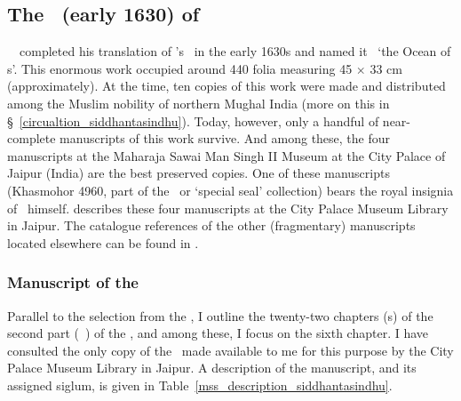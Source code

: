 \subsection{The \Siddhantasindhu\ (\circa early 1630) of \Nityananda}\label{siddhantasindhu_nityananda} 

\Pandita\ \Nityanandafull\ completed his translation of \MullaFarid's \ZijiShahJahani\ in the early 1630s and named it \Siddhantasindhu\ `the Ocean of \mbox{\Siddhanta s}'. This enormous work occupied around 440 folia measuring 45 $\times$ 33 cm (approximately). At the time, ten copies of this work were made and distributed among the Muslim nobility of northern Mughal India (more on this in \S~\ref{circualtion_siddhantasindhu}). Today, however, only a handful of near-complete manuscripts of this work survive. And among these, the four manuscripts at the Maharaja Sawai Man Singh II Museum at the City Palace of Jaipur (India) are the best preserved copies. One of these manuscripts (Khasmohor 4960, part of the \khasmohor\ or `special seal' collection) bears the royal insignia of \Shahjahan\ himself. \textcite[138--143]{PingreeJaipur} describes these four manuscripts at the City Palace Museum Library in Jaipur. The catalogue references of the other (fragmentary) manuscripts located elsewhere can be found in \textcites[CESS A3, p.\thinspace 173b, and CESS A5, p.\thinspace 184a]{PingreeCESS}.

\subsubsection{Manuscript of the \Siddhantasindhu} \label{manuscript_siddhantasindhu} 
Parallel to the selection from the \ZijiShahJahani, I outline the twenty-two chapters (\adhyaya s) of the second part (\dvitiya\ \kanda) of the \Siddhantasindhu, and among these, I focus on the sixth chapter. I have consulted the only copy of the \Siddhantasindhu\ made available to me for this purpose by the City Palace Museum Library in Jaipur. A description of the manuscript, and its assigned siglum, is given in Table~\ref{mss_description_siddhantasindhu}.

